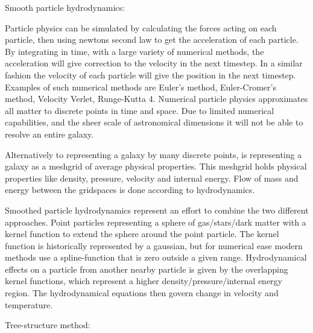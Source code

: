 Smooth particle hydrodynamics:

Particle physics can be simulated by calculating the forces acting on each particle, then using newtons second law to get the acceleration of each particle.
By integrating in time, with a large variety of numerical methods, the acceleration will give correction to the velocity in the next timestep.
In a similar fashion the velocity of each particle will give the position in the next timestep.
Examples of such numerical methods are Euler's method, Euler-Cromer's method, Velocity Verlet, Runge-Kutta 4.
Numerical particle physics approximates all matter to discrete points in time and space. Due to limited numerical capabilities, and the sheer scale of astronomical dimensions it will not be able to resolve an entire galaxy.

Alternatively to representing a galaxy by many discrete points, is representing a galaxy as a meshgrid of average physical properties.
This meshgrid holds physical properties like density, pressure, velocity and internal energy. Flow of mass and energy between the gridspaces is done according to hydrodynamics.

Smoothed particle hydrodynamics represent an effort to combine the two different approaches. Point particles representing a sphere of gas/stars/dark matter with a kernel function to extend the sphere around the point particle.
The kernel function is historically represented by a gaussian, but for numerical ease modern methods use a spline-function that is zero outside a given range.
Hydrodynamical effects on a particle from another nearby particle is given by the overlapping kernel functions, which represent a higher density/pressure/internal energy region. The hydrodynamical equations then govern change in velocity and temperature.

Tree-structure method:

